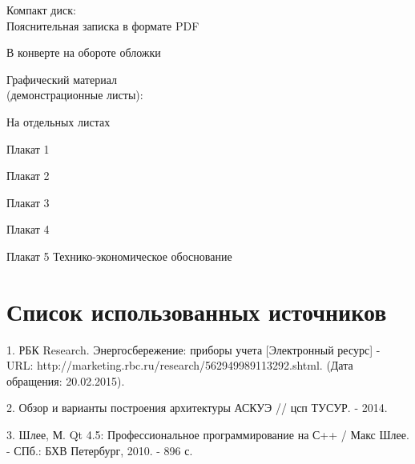 


 
 
 
 
 \newpage
 \tableofcontents
 \vspace{1cm}
 \begin{minipage}[left]{0.6\linewidth}
  Компакт диск: \\
  Пояснительная записка в формате PDF
 \end{minipage}
 \hfill
 \begin{minipage}[right]{0.3\linewidth}
  В конверте на обороте обложки 
 \end{minipage}
 
 \vspace{1cm}
 
 \begin{minipage}[left]{0.6\linewidth}
  Графический материал \\ (демонстрационные листы):
 \end{minipage}
 \hfill
 \begin{minipage}[right]{0.3\linewidth}
  На отдельных листах
 \end{minipage}
 
 \vspace{1cm}
 
 Плакат 1
 
 Плакат 2
 
 Плакат 3
 
 Плакат 4
 
 Плакат 5 Технико-экономическое обоснование
 
 
 
 
 
 
 \newpage
 \section*{Список использованных источников}
 1. РБК Research. Энергосбережение: приборы учета [Электронный ресурс] - URL: http://marketing.rbc.ru/research/562949989113292.shtml. (Дата обращения: 20.02.2015).
 
 2. Обзор и варианты построения архитектуры АСКУЭ // цсп ТУСУР. - 2014.
 
 3. Шлее, М. Qt 4.5: Профессиональное программирование на С++ / Макс Шлее. - СПб.: БХВ Петербург, 2010. - 896 с.
 
